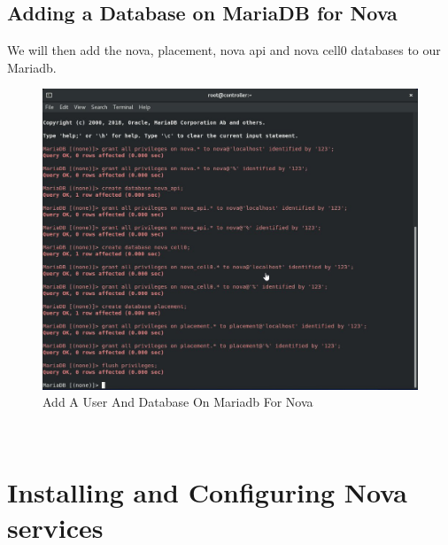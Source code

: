 \begin{spacing}{1.2}
\subsection{Adding a Database on MariaDB for Nova}
\par We will then add the nova, placement, nova api and nova cell0 databases to our Mariadb. 
\\
\begin{figure}[!htb] 
\begin{center} 
\includegraphics[width=1\linewidth]{Cloud/Nova Setup in Keystone/Add A User And Database On Mariadb For Nova} 
\end{center} 
\caption{Add A User And Database On Mariadb For Nova} 
\end{figure}  \FloatBarrier 
\\

\section{Installing and Configuring Nova services}

\end{spacing}
